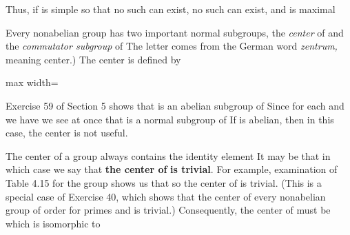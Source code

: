 \documentclass[11pt,oneside]{article}
\begin{document}
\BookNarrativetrue

\begin{BookBody}

\noindent Thus, if  is simple so that no such \BookInline{\gamma [N]} can exist, no such  can exist, and  is maximal\BookEnd{\blacklozenge}


\noindent Every nonabelian group  has two important normal subgroups, the\textit{ center}  of  and the\textit{ commutator subgroup}  of The letter  comes from the German word \textit{zentrum,} meaning center.) The center  is defined by

\begin{center}\begin{adjustbox}{max width=\linewidth}\end{adjustbox}\end{center}

\noindent Exercise 59 of Section 5 shows that  is an abelian subgroup of  Since for each   and  we have  we see at once that  is a normal subgroup of  If  is abelian, then  in this case, the center is not useful.

 The center of a group  always contains the identity element  It may be that   in which case we say that\textbf{ the center of}  \textbf{is trivial}. For example, examination of Table 4.15 for the group  shows us that  so the center of  is trivial. (This is a special case of Exercise 40, which shows that the center of every nonabelian group of order  for primes  and  is trivial.) Consequently, the center of  must be  which is isomorphic to \BookEnd{\blacktriangle}


\end{BookBody}
\end{document}
